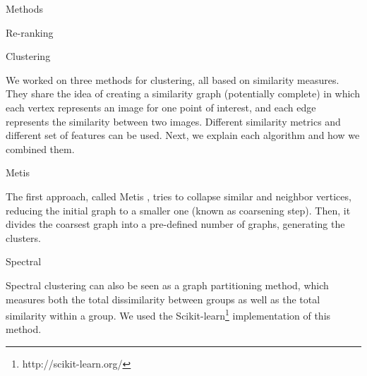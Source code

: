 \documentclass{acm_proc_article-me}
\begin{document}
\begin{section}{Methods}
\begin{subsection}{Re-ranking}

\end{subsection}


\begin{subsection}{Clustering}

We worked on three methods for clustering, all based on similarity measures.
They share the idea of creating a similarity graph (potentially complete) in which each vertex represents an image for one point of interest, and
each edge represents the similarity between two images. Different similarity metrics and different set of features can be used.
Next, we explain each algorithm and how we combined them.


\begin{subsubsection}{Metis}

The first approach, called Metis \cite{metis},
tries to collapse similar and neighbor vertices, reducing the initial graph to a smaller one (known as coarsening step).
Then, it divides the coarsest graph into a pre-defined number of graphs, generating the clusters.  

\end{subsubsection}

\begin{subsubsection}{Spectral}

Spectral clustering \cite{spectral} can also be seen as a graph partitioning method, which measures both the total dissimilarity between groups 
as well as the total similarity within a group. We used the 
Scikit-learn\footnote{http://scikit-learn.org/} 
implementation of this method. 



\end{subsubsection}
\end{subsection}
\end{section}
\end{document}
